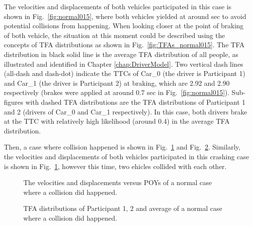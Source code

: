 The velocities and displacements of both vehicles participated in this case is shown in Fig.~\ref{fig:normal015}, where both vehicles yielded at around  sec to avoid potential collisions from happening. When looking closer at the point of braking of both vehicle, the situation at this moment could be described using the concepts of TFA distributions as shown in Fig.~\ref{fig:TFAs_normal015}. The TFA distribution in black solid line is the average TFA distribution of all people, as illustrated and identified in Chapter \ref{chap:DriverModel}. Two vertical dash lines (all-dash and dash-dot) indicate the TTCs of Car\_0 (the driver is Participant 1) and Car\_1 (the driver is Participant 2) at braking, which are 2.92 and 2.90 respectively (brakes were applied at around 0.7 sec in Fig.~\ref{fig:normal015}). Sub-figures with dashed TFA distributions are the TFA distributions of Participant 1 and 2 (drivers of Car\_0 and Car\_1 respectively). In this case, both drivers brake at the TTC with relatively high likelihood (around 0.4) in the average TFA distribution.

Then, a case where collision happened is shown in Fig.~\ref{fig:accident004} and Fig.~\ref{fig:TFAs_accident004}. Similarly, the velocities and displacements of both vehicles participated in this crashing case is shown in Fig.~\ref{fig:accident004}, however this time, two ehicles collided with each other. 


\begin{figure}[htbp!]
\begin{center}
\end{center}
\caption{The velocities and displacements versus POYs of a normal case where a collision did happened.}
\label{fig:accident004} 
\end{figure}

\begin{figure}[htbp!]
\begin{center}
\end{center}
\caption{TFA distributions of Participant 1, 2 and average of a normal case where a collision did happened.}
\label{fig:TFAs_accident004} 
\end{figure}



